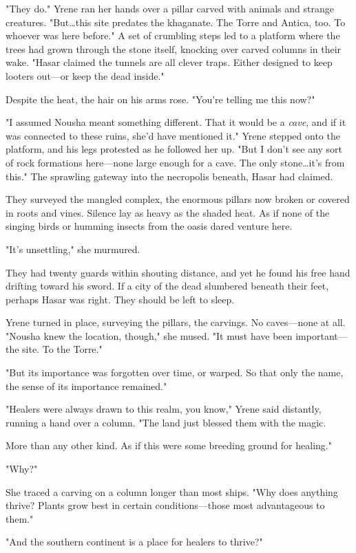 "They do."
Yrene ran her hands over a pillar carved with animals and strange creatures.
"But\ldots this site predates the khaganate.
The Torre and Antica, too.
To whoever was here before."
A set of crumbling steps led to a platform where the trees had grown through the stone itself, knocking over carved columns in their wake.
"Hasar claimed the tunnels are all clever traps.
Either designed to keep looters out---or keep the dead inside."

Despite the heat, the hair on his arms rose.
"You're telling me this now?"

"I assumed Nousha meant something different.
That it would be a \emph{cave}, and if it was connected to these ruins, she'd have mentioned it."
Yrene stepped onto the platform, and his legs protested as he followed her up.
"But I don't see any sort of rock formations here---none large enough for a cave.
The only stone\ldots it's from this."
The sprawling gateway into the necropolis beneath, Hasar had claimed.

They surveyed the mangled complex, the enormous pillars now broken or covered in roots and vines.
Silence lay as heavy as the shaded heat.
As if none of the singing birds or humming insects from the oasis dared venture here.

"It's unsettling," she murmured.

They had twenty guards within shouting distance, and yet he found his free hand drifting toward his sword.
If a city of the dead slumbered beneath their feet, perhaps Hasar was right.
They should be left to sleep.

Yrene turned in place, surveying the pillars, the carvings.
No caves---none at all.
"Nousha knew the location, though," she mused.
"It must have been important---the site.
To the Torre."

"But its importance was forgotten over time, or warped.
So that only the name, the sense of its importance remained."

"Healers were always drawn to this realm, you know," Yrene said distantly, running a hand over a column.
"The land just 
blessed them with the magic.

More than any other kind.
As if this were some breeding ground for healing."

"Why?"

She traced a carving on a column longer than most ships.
"Why does anything thrive?
Plants grow best in certain conditions---those most advantageous to them."

"And the southern continent is a place for healers to thrive?"

